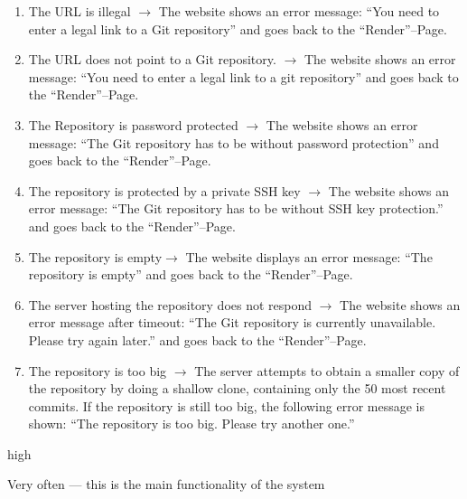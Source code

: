 \documentclass[11pt]{scrartcl}
\begin{document}
\begin{description}[leftmargin=!,labelwidth=\widthof{\bfseries Frequency of use:}]
	\item[Exceptions:]
		\begin{enumerate}[leftmargin=1.5em]
			\item The URL is illegal $\rightarrow$ The website shows an error message:
				\enquote{You need to enter a legal link to a Git repository} and goes
				back to the \enquote{Render}--Page.
			\item The URL does not point to a Git repository. $\rightarrow$  The website
				shows an error message: \enquote{You need to enter a legal link to a git
				repository} and goes back to the \enquote{Render}--Page.
			\item The Repository is password protected $\rightarrow$ The website shows an
				error message: \enquote{The Git repository has to be without password
				protection} and goes back to the \enquote{Render}--Page.
			\item The repository is protected by a private SSH key $\rightarrow$ The
				website shows an error message: \enquote{The Git repository has to be
				without SSH key protection.} and goes back to the
				\enquote{Render}--Page.
			\item The repository is empty$\rightarrow$ The website displays an error
				message: \enquote{The repository is empty} and goes back to the
				\enquote{Render}--Page.
			\item The server hosting the repository does not respond $\rightarrow$ The
				website shows an error message after timeout: \enquote{The Git
				repository is currently unavailable. Please try again later.} and goes
				back to the \enquote{Render}--Page. 
			\item The repository is too big $\rightarrow$  The server attempts to obtain a
				smaller copy of the repository by doing a shallow clone, containing only
				the 50 most recent commits. If the repository is still too big, the
				following error message is shown: \enquote{The
				repository is too big. Please try another one.}
		\end{enumerate}

	\item[Priority:] high
	\item[Frequency of use:] Very often --- this is the main functionality of the system

\end{description}
\end{document}
